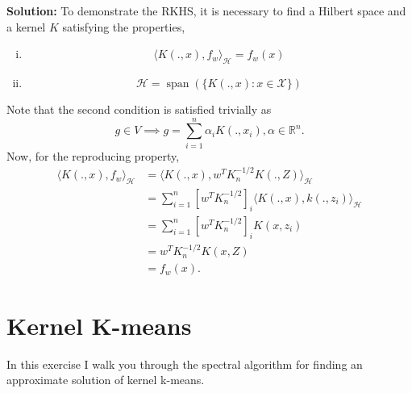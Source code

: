 \documentclass{article}[12pt]
\begin{document}
\begin{enumerate}
	\textbf{Solution:} To demonstrate the RKHS, it is necessary to find a Hilbert space and a kernel $K$ satisfying the properties,
	\begin{enumerate}[(i)]
		\item \[
				\langle K(., x), f_w \rangle_{\mathcal H} = f_w(x)
		\]
		\item \[
				\mathcal H = \operatorname{span}(\{K(., x): x \in \mathcal X\}) 
		\] 
	\end{enumerate}
Note that the second condition is satisfied trivially as
\begin{equation}
	g \in V \implies g = \sum^{n}_{i=1} \alpha_i K(., x_i), \alpha \in \mathbb R^n. 
\end{equation}
Now, for the reproducing property,
\begin{equation}
	\begin{aligned}
		\langle K(., x), f_w \rangle_{\mathcal H} &= \langle K(., x), w^T K_n^{-1/2} K(., Z) \rangle_{\mathcal H}\\
							  &= \sum^{n}_{i=1} \left[ w^T K_n^{-1/2} \right]_i \langle K(., x), k(., z_i) \rangle_{\mathcal H} \\
									     &= \sum^{n}_{i=1} \left[w^T K_n^{-1/2} \right]_i K(x, z_i)\\
									     &= w^T K_n^{-1/2} K(x, Z) \\
									     &= f_w(x).
	\end{aligned}
\end{equation}



 \end{enumerate}
 \section{Kernel K-means}
 
 In this exercise I walk you through the spectral algorithm for finding an approximate solution of kernel k-means. 
 
\end{document}
